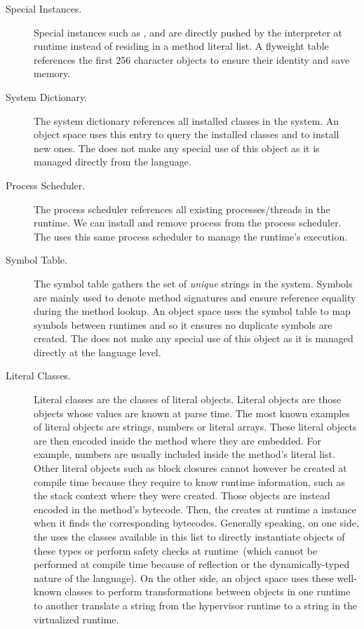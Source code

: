 \begin{description}
\item[Special Instances.] Special instances such as ,  and  are directly pushed by the \VM interpreter at runtime instead of residing in a method literal list. A flyweight  table references the first 256 character objects to ensure their identity and save memory.

\item[System Dictionary.] The system dictionary references all installed classes in the system. An object space uses this entry to query the installed classes and to install new ones. The \VM does not make any special use of this object as it is managed directly from the language.

\item[Process Scheduler.] The process scheduler references all existing processes/threads in the runtime. We can install and remove process from the process scheduler. The \VM uses this same process scheduler to manage the runtime's execution.

\item[Symbol Table.] The symbol table gathers the set of \emph{unique} strings in the system. Symbols are mainly used to denote method signatures and ensure reference equality during the method lookup. An object space uses the symbol table to map symbols between runtimes and so it ensures no duplicate symbols are created. The \VM does not make any special use of this object as it is managed directly at the language level.

\item[Literal Classes.] Literal classes are the classes of literal objects. Literal objects are those objects whose values are known at parse time. The most known examples of literal objects are strings, numbers or literal arrays. These literal objects are then encoded inside the method where they are embedded. For example, numbers are usually included inside the method's literal list. Other literal objects such as block closures cannot however be created at compile time because they require to know runtime information, such as the stack context where they were created. Those objects are instead encoded in the method's bytecode. Then, the \VM creates at runtime a  instance when it finds the corresponding bytecodes. Generally speaking, on one side, the \VM uses the classes available in this list to directly instantiate objects of these types or perform safety checks at runtime~(which cannot be performed at compile time because of reflection or the dynamically-typed nature of the language). On the other side, an object space uses these well-known classes to perform transformations between objects in one runtime to another \eg translate a string from the hypervisor runtime to a string in the virtualized runtime.


\end{description}

